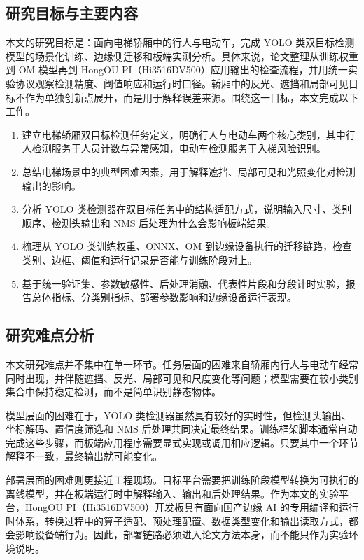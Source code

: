 \subsection{研究目标与主要内容}

本文的研究目标是：面向电梯轿厢中的行人与电动车，完成 YOLO 类双目标检测模型的场景化训练、边缘侧迁移和板端实测分析。具体来说，论文整理从训练权重到 OM 模型再到 HongOU PI（Hi3516DV500）应用输出的检查流程，并用统一实验协议观察检测精度、阈值响应和运行时口径。轿厢中的反光、遮挡和局部可见目标不作为单独创新点展开，而是用于解释误差来源。围绕这一目标，本文完成以下工作。

\begin{enumerate}
    \item 建立电梯轿厢双目标检测任务定义，明确行人与电动车两个核心类别，其中行人检测服务于人员计数与异常感知，电动车检测服务于入梯风险识别。
    \item 总结电梯场景中的典型困难因素，用于解释遮挡、局部可见和光照变化对检测输出的影响。
    \item 分析 YOLO 类检测器在双目标任务中的结构适配方式，说明输入尺寸、类别顺序、检测头输出和 NMS 后处理为什么会影响板端结果。
    \item 梳理从 YOLO 类训练权重、ONNX、OM 到边缘设备执行的迁移链路，检查类别、边框、阈值和运行记录是否能与训练阶段对上。
    \item 基于统一验证集、参数敏感性、后处理消融、代表性片段和分段计时实验，报告总体指标、分类别指标、部署参数影响和边缘设备运行表现。
\end{enumerate}


\subsection{研究难点分析}

本文研究难点并不集中在单一环节。任务层面的困难来自轿厢内行人与电动车经常同时出现，并伴随遮挡、反光、局部可见和尺度变化等问题；模型需要在较小类别集合中保持稳定检测，而不是简单识别静态物体。

模型层面的困难在于，YOLO 类检测器虽然具有较好的实时性，但检测头输出、坐标解码、置信度筛选和 NMS 后处理共同决定最终结果。训练框架脚本通常自动完成这些步骤，而板端应用程序需要显式实现或调用相应逻辑。只要其中一个环节解释不一致，最终输出就可能变化。

部署层面的困难则更接近工程现场。目标平台需要把训练阶段模型转换为可执行的离线模型，并在板端运行时中解释输入、输出和后处理结果。作为本文的实验平台，HongOU PI（Hi3516DV500）开发板具有面向国产边缘 AI 的专用编译和运行时体系，转换过程中的算子适配、预处理配置、数据类型变化和输出读取方式，都会影响设备端行为。因此，部署链路必须进入论文方法本身，而不能只作为实验环境说明。

